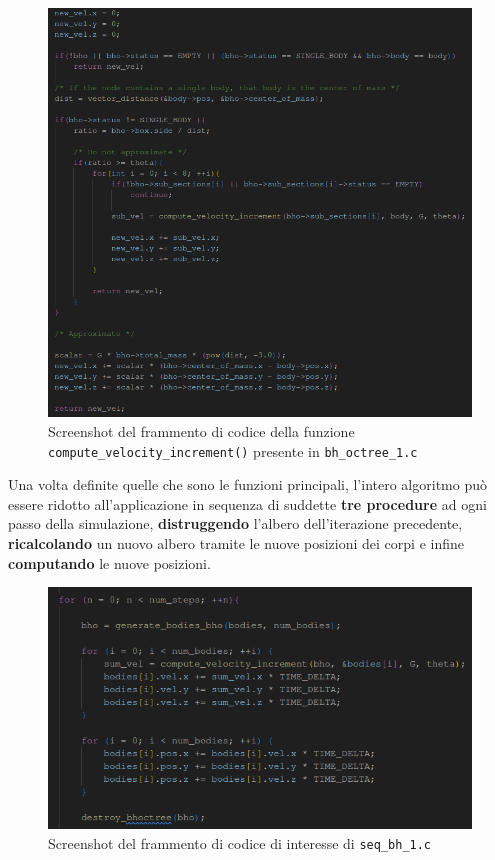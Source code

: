 \documentclass[12pt]{report}
\begin{document}
    \begin{figure}[H]
        \centering
        \includegraphics[width=\textwidth]{images/velocities.png}
        \caption{Screenshot del frammento di codice della funzione \texttt{compute\_velocity\_increment()} presente in \texttt{bh\_octree\_1.c}}
        \label{fig:velocities}
    \end{figure}

    \newpage

    Una volta definite quelle che sono le funzioni principali, l'intero algoritmo può essere ridotto all'applicazione in sequenza di suddette \textbf{tre procedure} ad ogni passo della simulazione, \textbf{distruggendo} l'albero dell'iterazione precedente, \textbf{ricalcolando} un nuovo albero tramite le nuove posizioni dei corpi e infine \textbf{computando} le nuove posizioni.

    \begin{figure}[H]
        \centering
        \includegraphics[width=\textwidth]{images/seq_bh_1.png}
        \caption{Screenshot del frammento di codice di interesse di \texttt{seq\_bh\_1.c}}
        \label{fig:seq_bh_1}
    \end{figure}
\end{document}
